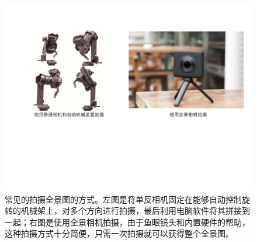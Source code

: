 \begin{figure}[!htbp]
    \centering
    \includegraphics[width=1.0\textwidth]{Img/capture-panorama.pdf}
    \caption[拍摄全景图的示例]
    {常见的拍摄全景图的方式。左图是将单反相机固定在能够自动控制旋转的机械架上，对多个方向进行拍摄，最后利用电脑软件将其拼接到一起；右图是使用全景相机拍摄，由于鱼眼镜头和内置硬件的帮助，这种拍摄方式十分简便，只需一次拍摄就可以获得整个全景图。}
    \label{fig:capture-panorama}
\end{figure}